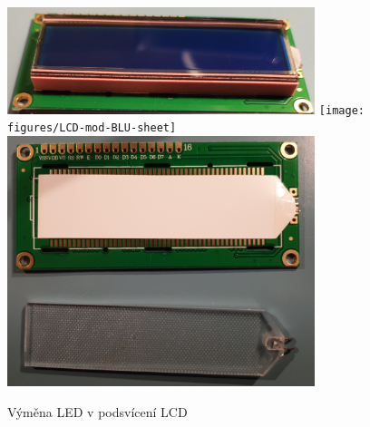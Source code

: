 \begin{figure}[htbp]
    \centering
    \includegraphics[width=0.8\textwidth]{figures/LCD-mod-disassembly}
    \texttt{[image: figures/LCD-mod-BLU-sheet]}
    \includegraphics[width=0.8\textwidth]{figures/LCD-mod-BLU-plexiglass}
    \caption{Výměna LED v podsvícení LCD}
    \label{fig:LCD modifikace}
\end{figure}


